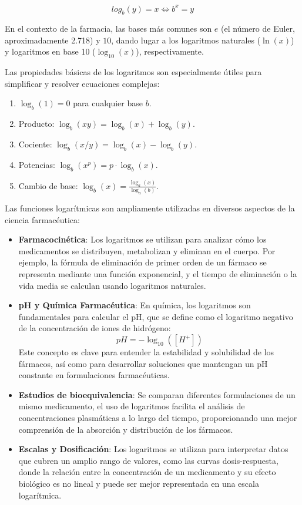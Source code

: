 \documentclass[
  letterpaper,
  DIV=11,
  numbers=noendperiod]{scrreprt}
\begin{document}
\[log_b(y) = x \Leftrightarrow b^x = y\]

En el contexto de la farmacia, las bases más comunes son \(e\) (el
número de Euler, aproximadamente 2.718) y \(10\), dando lugar a los
logaritmos naturales (\(\ln(x)\)) y logaritmos en base 10
(\(\log_{10}(x)\)), respectivamente.

Las propiedades básicas de los logaritmos son especialmente útiles para
simplificar y resolver ecuaciones complejas:

\begin{enumerate}
\def\labelenumi{\alph{enumi}.}
\item
  \(\log_b(1) = 0\) para cualquier base \(b\).
\item
  Producto: \(\log_b(xy) = \log_b(x) + \log_b(y)\).
\item
  Cociente: \(\log_b(x/y) = \log_b(x) - \log_b(y)\).
\item
  Potencias: \(\log_b(x^p) = p \cdot \log_b(x)\).
\item
  Cambio de base: \(\log_b(x) = \frac{\log_a(x)}{\log_a(b)}\).
\end{enumerate}

Las funciones logarítmicas son ampliamente utilizadas en diversos
aspectos de la ciencia farmacéutica:

\begin{itemize}
\item
  \textbf{Farmacocinética}: Los logaritmos se utilizan para analizar
  cómo los medicamentos se distribuyen, metabolizan y eliminan en el
  cuerpo. Por ejemplo, la fórmula de eliminación de primer orden de un
  fármaco se representa mediante una función exponencial, y el tiempo de
  eliminación o la vida media se calculan usando logaritmos naturales.
\item
  \textbf{pH y Química Farmacéutica}: En química, los logaritmos son
  fundamentales para calcular el pH, que se define como el logaritmo
  negativo de la concentración de iones de hidrógeno:
  \[pH = -\log_{10}([H^+])\] Este concepto es clave para entender la
  estabilidad y solubilidad de los fármacos, así como para desarrollar
  soluciones que mantengan un pH constante en formulaciones
  farmacéuticas.
\item
  \textbf{Estudios de bioequivalencia}: Se comparan diferentes
  formulaciones de un mismo medicamento, el uso de logaritmos facilita
  el análisis de concentraciones plasmáticas a lo largo del tiempo,
  proporcionando una mejor comprensión de la absorción y distribución de
  los fármacos.
\item
  \textbf{Escalas y Dosificación}: Los logaritmos se utilizan para
  interpretar datos que cubren un amplio rango de valores, como las
  curvas dosis-respuesta, donde la relación entre la concentración de un
  medicamento y su efecto biológico es no lineal y puede ser mejor
  representada en una escala logarítmica.
\end{itemize}
\end{document}
